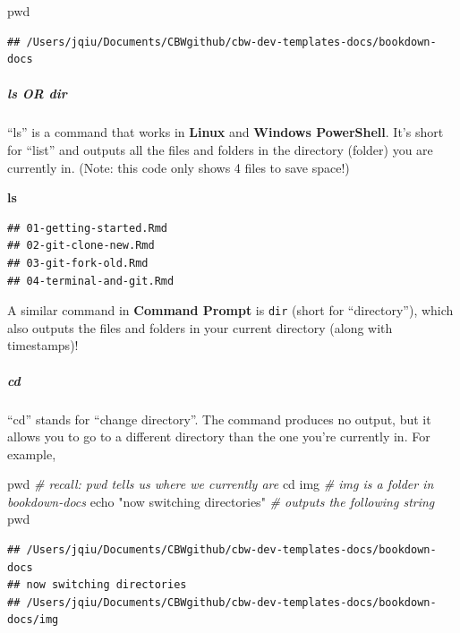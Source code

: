\documentclass[
]{book}
\newenvironment{Shaded}{\begin{snugshade}}{\end{snugshade}}
\newcommand{\BuiltInTok}[1]{#1}
\newcommand{\CommentTok}[1]{\textcolor[rgb]{0.56,0.35,0.01}{\textit{#1}}}
\newcommand{\FunctionTok}[1]{\textcolor[rgb]{0.13,0.29,0.53}{\textbf{#1}}}
\newcommand{\NormalTok}[1]{#1}
\newcommand{\StringTok}[1]{\textcolor[rgb]{0.31,0.60,0.02}{#1}}
\theoremstyle{definition}
\theoremstyle{definition}
\theoremstyle{definition}
\theoremstyle{definition}
\theoremstyle{remark}
\begin{document}
\begin{Shaded}
\begin{Highlighting}[]
\BuiltInTok{pwd}
\end{Highlighting}
\end{Shaded}

\begin{verbatim}
## /Users/jqiu/Documents/CBWgithub/cbw-dev-templates-docs/bookdown-docs
\end{verbatim}

\subparagraph*{ls OR dir}\label{ls-or-dir}

``ls'' is a command that works in \textbf{Linux} and \textbf{Windows PowerShell}. It's short for ``list'' and outputs all the files and folders in the directory (folder) you are currently in. (Note: this code only shows 4 files to save space!)

\begin{Shaded}
\begin{Highlighting}[]
\FunctionTok{ls}
\end{Highlighting}
\end{Shaded}

\begin{verbatim}
## 01-getting-started.Rmd
## 02-git-clone-new.Rmd
## 03-git-fork-old.Rmd
## 04-terminal-and-git.Rmd
\end{verbatim}

A similar command in \textbf{Command Prompt} is \texttt{dir} (short for ``directory''), which also outputs the files and folders in your current directory (along with timestamps)!

\subparagraph*{cd}\label{cd}

``cd'' stands for ``change directory''. The command produces no output, but it allows you to go to a different directory than the one you're currently in. For example,

\begin{Shaded}
\begin{Highlighting}[]
\BuiltInTok{pwd} \CommentTok{\# recall: pwd tells us where we currently are}
\BuiltInTok{cd}\NormalTok{ img }\CommentTok{\# img is a folder in bookdown{-}docs}
\BuiltInTok{echo} \StringTok{"now switching directories"} \CommentTok{\# outputs the following string}
\BuiltInTok{pwd}
\end{Highlighting}
\end{Shaded}

\begin{verbatim}
## /Users/jqiu/Documents/CBWgithub/cbw-dev-templates-docs/bookdown-docs
## now switching directories
## /Users/jqiu/Documents/CBWgithub/cbw-dev-templates-docs/bookdown-docs/img
\end{verbatim}
\end{document}
